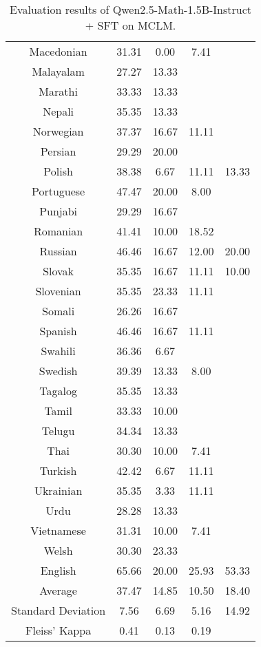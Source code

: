 \begin{table*}[]
\begin{tabular}{c|cccc}
Macedonian & 31.31 & 0.00 & 7.41 &  \\
Malayalam & 27.27 & 13.33 & \multicolumn{1}{l}{} &  \\
Marathi & 33.33 & 13.33 & \multicolumn{1}{l}{} &  \\
Nepali & 35.35 & 13.33 & \multicolumn{1}{l}{} &  \\
Norwegian & 37.37 & 16.67 & 11.11 &  \\
Persian & 29.29 & 20.00 & \multicolumn{1}{l}{} &  \\
Polish & 38.38 & 6.67 & 11.11 & 13.33 \\
Portuguese & 47.47 & 20.00 & 8.00 &  \\
Punjabi & 29.29 & 16.67 & \multicolumn{1}{l}{} &  \\
Romanian & 41.41 & 10.00 & 18.52 &  \\
Russian & 46.46 & 16.67 & 12.00 & 20.00 \\
Slovak & 35.35 & 16.67 & 11.11 & 10.00 \\
Slovenian & 35.35 & 23.33 & 11.11 &  \\
Somali & 26.26 & 16.67 & \multicolumn{1}{l}{} &  \\
Spanish & 46.46 & 16.67 & 11.11 &  \\
Swahili & 36.36 & 6.67 & \multicolumn{1}{l}{} &  \\
Swedish & 39.39 & 13.33 & 8.00 &  \\
Tagalog & 35.35 & 13.33 & \multicolumn{1}{l}{} &  \\
Tamil & 33.33 & 10.00 & \multicolumn{1}{l}{} &  \\
Telugu & 34.34 & 13.33 & \multicolumn{1}{l}{} &  \\
Thai & 30.30 & 10.00 & 7.41 &  \\
Turkish & 42.42 & 6.67 & 11.11 &  \\
Ukrainian & 35.35 & 3.33 & 11.11 &  \\
Urdu & 28.28 & 13.33 & \multicolumn{1}{l}{} &  \\
Vietnamese & 31.31 & 10.00 & 7.41 &  \\
Welsh & 30.30 & 23.33 & \multicolumn{1}{l}{} &  \\
\rowcolor[HTML]{FCE5CD} 
English & 65.66 & 20.00 & 25.93 & 53.33 \\ \midrule
Average & 37.47 & 14.85 & 10.50 & 18.40 \\
Standard Deviation & 7.56 & 6.69 & 5.16 & 14.92 \\
Fleiss' Kappa & 0.41 & 0.13 & 0.19 & \\ \bottomrule
\end{tabular}
\caption{\footnotesize Evaluation results of Qwen2.5-Math-1.5B-Instruct + SFT on MCLM.}
\label{tab:qwen_math_1_5B_sft}
\end{table*}


